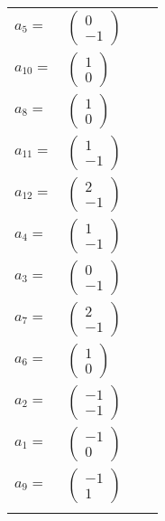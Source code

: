 \documentclass[1p]{elsarticle_modified}
\theoremstyle{definition}
\begin{document}
\begin{tabular}{m{7pt} m{180pt} m{7pt} m{180pt} }
\flushright $a_{5}=$&$\begin{pmatrix}0\\-1\end{pmatrix}$ \\
\flushright $a_{10}=$&$\begin{pmatrix}1\\0\end{pmatrix}$ \\
\flushright $a_{8}=$&$\begin{pmatrix}1\\0\end{pmatrix}$ \\
\flushright $a_{11}=$&$\begin{pmatrix}1\\-1\end{pmatrix}$ \\
\flushright $a_{12}=$&$\begin{pmatrix}2\\-1\end{pmatrix}$ \\
\flushright $a_{4}=$&$\begin{pmatrix}1\\-1\end{pmatrix}$ \\
\flushright $a_{3}=$&$\begin{pmatrix}0\\-1\end{pmatrix}$ \\
\flushright $a_{7}=$&$\begin{pmatrix}2\\-1\end{pmatrix}$ \\
\flushright $a_{6}=$&$\begin{pmatrix}1\\0\end{pmatrix}$ \\
\flushright $a_{2}=$&$\begin{pmatrix}-1\\-1\end{pmatrix}$ \\
\flushright $a_{1}=$&$\begin{pmatrix}-1\\0\end{pmatrix}$ \\
\flushright $a_{9}=$&$\begin{pmatrix}-1\\1\end{pmatrix}$\\&\end{tabular}
\end{document}
